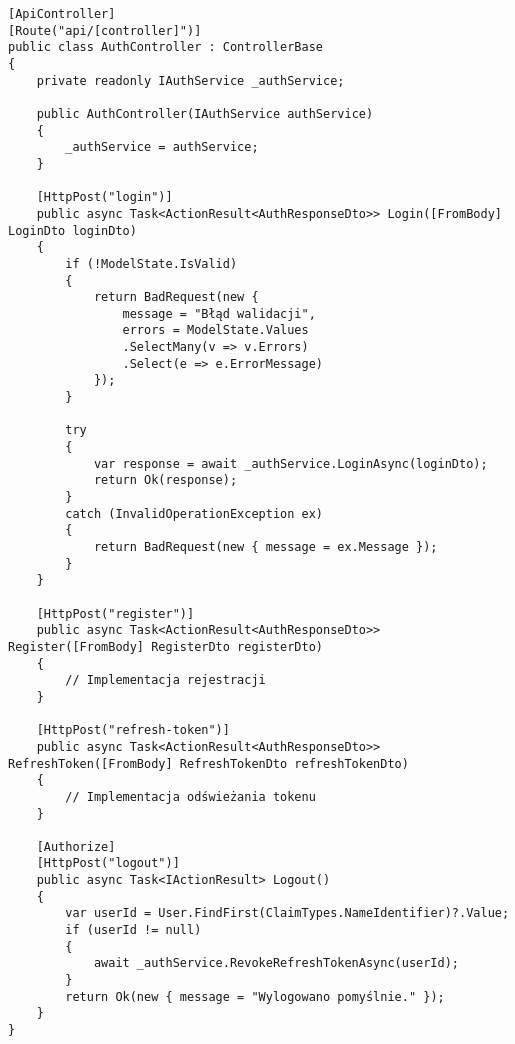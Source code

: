 \begin{lstlisting}[style=csharp, caption={Kontroler autentykacji},label={lst:kontrolerautentykacji}]
[ApiController]
[Route("api/[controller]")]
public class AuthController : ControllerBase
{
	private readonly IAuthService _authService;
	
	public AuthController(IAuthService authService)
	{
		_authService = authService;
	}
	
	[HttpPost("login")]
	public async Task<ActionResult<AuthResponseDto>> Login([FromBody] LoginDto loginDto)
	{
		if (!ModelState.IsValid)
		{
			return BadRequest(new { 
				message = "Błąd walidacji",
				errors = ModelState.Values
				.SelectMany(v => v.Errors)
				.Select(e => e.ErrorMessage)
			});
		}
		
		try
		{
			var response = await _authService.LoginAsync(loginDto);
			return Ok(response);
		}
		catch (InvalidOperationException ex)
		{
			return BadRequest(new { message = ex.Message });
		}
	}
	
	[HttpPost("register")]
	public async Task<ActionResult<AuthResponseDto>> Register([FromBody] RegisterDto registerDto)
	{
		// Implementacja rejestracji
	}
	
	[HttpPost("refresh-token")]
	public async Task<ActionResult<AuthResponseDto>> RefreshToken([FromBody] RefreshTokenDto refreshTokenDto)
	{
		// Implementacja odświeżania tokenu
	}
	
	[Authorize]
	[HttpPost("logout")]
	public async Task<IActionResult> Logout()
	{
		var userId = User.FindFirst(ClaimTypes.NameIdentifier)?.Value;
		if (userId != null)
		{
			await _authService.RevokeRefreshTokenAsync(userId);
		}
		return Ok(new { message = "Wylogowano pomyślnie." });
	}
}
\end{lstlisting}

